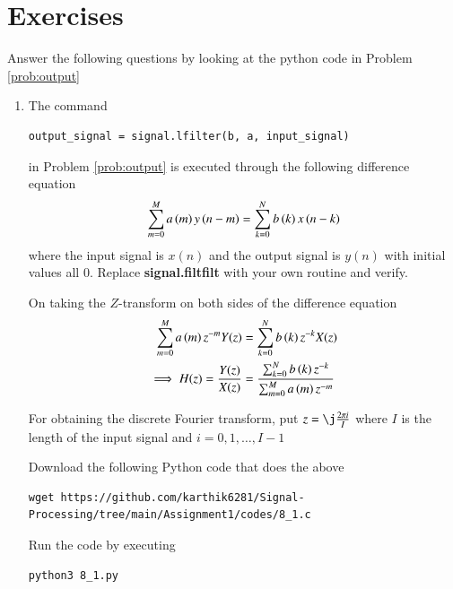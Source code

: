 \documentclass[journal,12pt,twocolumn]{IEEEtran}
\renewcommand\thesection{\arabic{section}}
\begin{document}
     \section{Exercises}
     Answer the following questions by looking at the python code in Problem \ref{prob:output}
     \begin{enumerate}[label=\thesection.\arabic*]
          \item The command
               \begin{lstlisting}
output_signal = signal.lfilter(b, a, input_signal)
               \end{lstlisting}
               in Problem \ref{prob:output} is executed through the following difference equation
               \begin{equation}
                    \label{eq:iir_filter_gen}
                    \sum _{m=0}^{M}a\left(m\right)y\left(n-m\right)=\sum _{k=0}^{N}b\left(k\right)x\left(n-k\right)
               \end{equation}
               where the input signal is $x(n)$ and the output signal is $y(n)$ with initial values all 0. Replace \textbf{signal.filtfilt} with your own routine and verify.

               \solution On taking the $Z$-transform on both sides of the difference equation
               \begin{align}
                    \sum _{m=0}^{M}a\left(m\right) z^{-m} Y(z) & = \sum _{k=0}^{N}b\left(k\right) z^{-k} X(z)                                    \\
                    \implies H(z) = \frac{Y(z)}{X(z)}    & = \frac{\sum _{k=0}^{N}b\left(k\right) z^{-k}}{\sum _{m=0}^{M}a\left(m\right) z^{-m}}
               \end{align}

               For obtaining the discrete Fourier transform, put $z = \j \frac{2\pi i}{I}$ where $I$ is the length of the input signal and $i = 0, 1, \ldots, I-1$

               Download the following Python code that does the above
               \begin{lstlisting}
wget https://github.com/karthik6281/Signal-Processing/tree/main/Assignment1/codes/8_1.c
               \end{lstlisting}

               Run the code by executing
               \begin{lstlisting}
python3 8_1.py
               \end{lstlisting}


\end{enumerate}
\end{document}
